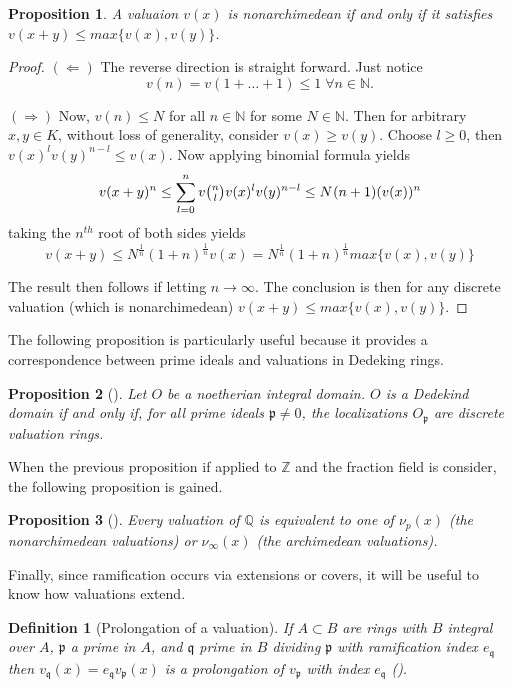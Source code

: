 \documentclass[paper=a4, fontsize=11pt]{scrartcl} %
\numberwithin{equation}{section} %
\numberwithin{figure}{section} %
\numberwithin{table}{section} %
\theoremstyle{break}
\newtheorem{defn}{Definition}
\newtheorem{prop}{Proposition}
\begin{document}
\begin{prop}
 A valuaion $v(x)$ is nonarchimedean if and only if it satisfies $v(x+y) \leq max\{v(x),v(y)\}$.
\end{prop}
\begin{proof}
$(\Leftarrow)$ The reverse direction is straight forward. Just notice 
$$v(n)=v(1+\ldots+1) \leq 1\; \forall n\in\mathbb{N}.$$

$(\Rightarrow)$ Now, $v(n) \leq N$ for all $n\in\mathbb{N}$ for some $N \in \mathbb{N}$. Then for arbitrary $x,y\in K$, without loss of generality, consider $v(x) \geq v(y)$. Choose $l \geq 0$, then $v(x)^{l}v(y)^{n-l} \leq v(x)$. Now applying binomial formula yields
$$
	v(x+y)^{n} \leq \sum_{l=0}^{n} v\tbinom{n}{l} v(x)^l v(y)^{n-l} \leq N^{}(n+1)(v(x))^n
$$
taking the $n^{th}$ root of both sides yields
$$
v(x+y) \leq N^{\frac{1}{n}}(1+n)^{\frac{1}{n}} v(x) = N^{\frac{1}{n}}(1+n)^{\frac{1}{n}} max\{v(x), v(y) \}
$$

The result then follows if letting $n \to \infty$. The conclusion is then for any discrete valuation (which is nonarchimedean) $v(x+y) \leq max \{v(x),v(y) \}$.
\end{proof}

The following proposition is particularly useful because it provides a correspondence between prime ideals and valuations in Dedeking rings.
\begin{prop}[\cite{Neukirch}]
Let $O$ be a noetherian integral domain. $O$ is a Dedekind domain if and only if, for all prime ideals $\mathfrak{p} \not= 0$, the localizations $O_\mathfrak{p}$ are discrete valuation rings.
\end{prop}
When the previous proposition if applied to $\mathbb{Z}$ and the fraction field is consider, the following proposition is gained.
\begin{prop}[\cite{Neukirch}]
Every valuation of $\mathbb{Q}$ is equivalent to one of $\nu_p(x)$ (the nonarchimedean valuations) or $\nu_\infty(x)$ (the archimedean valuations).
\end{prop}
Finally, since ramification occurs via extensions or covers, it will be useful to know how valuations extend.
\begin{defn}[Prolongation of a valuation]
If $A \subset B$ are rings with $B$ integral over $A$, $\mathfrak{p}$ a prime in $A$, and $\mathfrak{q}$ prime in $B$ dividing $\mathfrak{p}$ with ramification index $e_\mathfrak{q}$ then $v_\mathfrak{q}(x)=e_\mathfrak{q}v_\mathfrak{p}(x)$ is a prolongation of $v_\mathfrak{p}$ with index $e_\mathfrak{q}$ (\cite{Serre}).
\end{defn}
\end{document}
